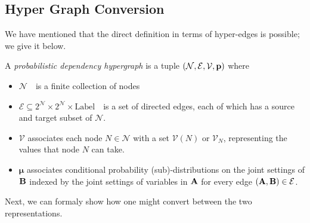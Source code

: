 \documentclass{article}
\newcommand{\bmu}{\boldsymbol{\mu}}
\newcommand{\V}{\mathcal V}
\newcommand{\N}{\mathcal N}
\newcommand{\Ed}{\mathcal E}
\newcommand{\modelnamehyper}{probabilistic dependency hypergraph}
\newcommand{\MNH}{PDH}
\numberwithin{equation}{section}
\begin{document}
	\subsection{Hyper Graph Conversion}\label{sec:hyper-convert}
	We have mentioned that the direct definition in terms of hyper-edges is possible; we give it below.
	
	\begin{defn}[\MNH]\label{def:hypermodel}
		A \emph{\modelnamehyper} is a tuple $\mnvars[]$ where
		\begin{itemize}[nosep]
			\item $\N$~~is a finite collection of nodes
			\item $\Ed \subseteq 2^{\N} \times 2^{\N} \times \mathrm{Label}$~~is a set of directed edges, each of which has a source and target subset of $\N$.
			\item $\V$ associates each node $N \in \mathcal N$ with a set $\V(N)$ or $\V_N$, representing the values that node $N$ can take.
			\item $\bmu$
			associates conditional probability (sub)-distributions on the joint settings of $\bf B$ indexed by the joint settings of variables in $\bf A$ for every edge $({\bf A,B}) \in \Ed$. %
		\end{itemize}
	\end{defn}
	
	Next, we can formaly show how one might convert between the two representations.
		
\end{document}
